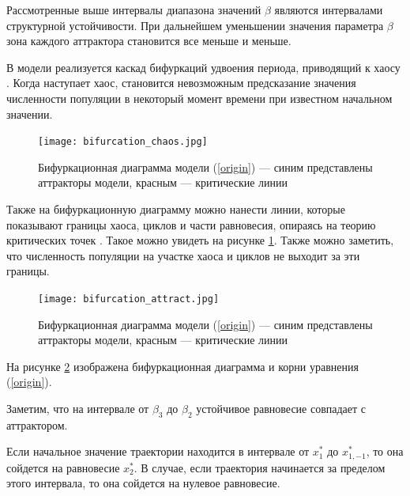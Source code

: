         Рассмотренные выше интервалы диапазона значений \(\beta\) являются интервалами структурной устойчивости. При дальнейшем уменьшении значения параметра \(\beta\) зона каждого аттрактора становится все меньше и меньше. 
        
        В модели реализуется каскад бифуркаций удвоения периода, приводящий к хаосу \cite[стр. 33]{elementsOfNonlinearDynamic}. Когда наступает хаос, становится невозможным предсказание значения численности популяции в некоторый момент времени при известном начальном значении.
        
        \begin{figure}
            \centering
            \texttt{[image: bifurcation\_chaos.jpg]}

            \captionsetup{justification=centering}
            \caption{Бифуркационная диаграмма модели (\ref{origin}) --- синим представлены аттракторы модели, красным --- критические линии }
            \label{bifurcation_chaos}
        \end{figure}
        
        Также на бифуркационную диаграмму можно нанести линии, которые показывают границы хаоса, циклов и части равновесия, опираясь на теорию критических точек \cite{nonsmoothOneDimensionalMapsSomeBasicConceptsAndDefinitions}. Такое можно увидеть на рисунке \ref{bifurcation_chaos}. Также можно заметить, что численность популяции на участке хаоса и циклов не выходит за эти границы.
        
        \begin{figure}
            \centering
            \texttt{[image: bifurcation\_attract.jpg]}

            \captionsetup{justification=centering}
            \caption{Бифуркационная диаграмма модели (\ref{origin}) --- синим представлены аттракторы модели, красным --- критические линии }
            \label{bifurcation_attractor}
        \end{figure}

        На рисунке \ref{bifurcation_attractor} изображена бифуркационная диаграмма и корни уравнения (\ref{origin}).

        Заметим, что на интервале от \(\beta_3\) до \(\beta_2\) устойчивое равновесие совпадает с аттрактором.

        Если начальное значение траектории находится в интервале от \(x_1^*\) до \(x_{1, -1}^*\), то она сойдется на равновесие \(x_2^*\). В случае, если траектория начинается за пределом этого интервала, то она сойдется на нулевое равновесие.

